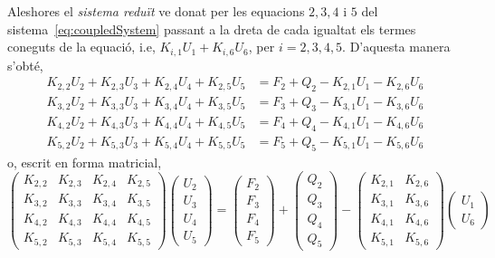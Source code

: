 \documentclass[aspectratio=169,xcolor=dvipsnames]{beamer}
\begin{document}
\begin{frame}
  \begin{block}{}\justifying
  Aleshores el \emph{sistema reduït} ve donat per les equacions $2,3,4$ i
  $5$ del sistema~\eqref{eq:coupledSystem} passant a la dreta de cada
  igualtat els termes coneguts de la equació, i.e, $K_{i,1} U_{1} + K_{i,6}
  U_{6}$, per $i=2,3,4,5$. D'aquesta manera s'obté,
  \begin{displaymath}
    \begin{split}
      K_{2,2} U_{2} + K_{2,3} U_{3} + K_{2,4} U_{4} + K_{2,5} U_{5} &=
      F_{2} + Q_{2} - K_{2,1} U_{1} - K_{2,6} U_{6}\\ 
      K_{3,2} U_{2} + K_{3,3} U_{3} + K_{3,4} U_{4} + K_{3,5} U_{5} &=
      F_{3} + Q_{3} - K_{3,1} U_{1} - K_{3,6} U_{6}\\ 
      K_{4,2} U_{2} + K_{4,3} U_{3} + K_{4,4} U_{4} + K_{4,5} U_{5} &=
      F_{4} + Q_{4} - K_{4,1} U_{1} - K_{4,6} U_{6}\\ 
      K_{5,2} U_{2} + K_{5,3} U_{3} + K_{5,4} U_{4} + K_{5,5} U_{5} &=
      F_{5} + Q_{5} - K_{5,1} U_{1} - K_{5,6} U_{6} 
  \end{split}
  \end{displaymath}
  o, escrit en forma matricial,
  \begin{equation}\label{eq:reducedSystemM}
    \begin{pmatrix}
      K_{2,2} & K_{2,3} & K_{2,4} & K_{2,5}\\
      K_{3,2} & K_{3,3} & K_{3,4} & K_{3,5}\\
      K_{4,2} & K_{4,3} & K_{4,4} & K_{4,5}\\
      K_{5,2} & K_{5,3} & K_{5,4} & K_{5,5}
    \end{pmatrix}
    \begin{pmatrix}
      U_{2}\\
      U_{3}\\
      U_{4}\\
      U_{5}
    \end{pmatrix} =
    \begin{pmatrix}
      F_{2} \\
      F_{3} \\
      F_{4} \\
      F_{5}
   \end{pmatrix} + 
   \begin{pmatrix}
      Q_{2} \\
      Q_{3} \\
      Q_{4} \\
      Q_{5}
   \end{pmatrix} - 
   \begin{pmatrix}
     K_{2,1} & K_{2,6} \\
     K_{3,1} & K_{3,6} \\
     K_{4,1} & K_{4,6} \\
     K_{5,1} & K_{5,6}
   \end{pmatrix}
   \begin{pmatrix}
     U_{1}\\
     U_{6}
   \end{pmatrix}
  \end{equation}
\end{block}
\end{frame}
\end{document}
